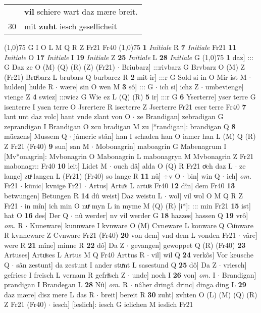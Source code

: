 \documentclass[8pt,a4paper,notitlepage]{article}
\begin{document}
\begin{table}[ht]
\begin{minipage}[t]{0.5\linewidth}
\begin{tabular}{rl}
 & \textbf{vil} schiere wart daz mære breit.\\ 
30 & mit \textbf{zuht} iesch gesellicheit\\ 
\end{tabular}
\scriptsize
\line(1,0){75} \newline
G I O L M Q R Z Fr21 Fr40 \newline
\line(1,0){75} \newline
\textbf{1} \textit{Initiale} R  \textbf{7} \textit{Initiale} Fr21  \textbf{11} \textit{Initiale} O  \textbf{17} \textit{Initiale} I  \textbf{19} \textit{Initiale} Z  \textbf{25} \textit{Initiale} L  \textbf{28} \textit{Initiale} G  \newline
\line(1,0){75} \newline
\textbf{1} daz] ::: G Daz ze O (M) (Q) (R) (Z) (Fr21)  $\cdot$ Briubarz] :::rivbarz G Brvbarz O (M) Z (Fr21) Bruͯbarz L brubars Q burbarcz R \textbf{2} mit ir] :::r G Sold si in O Mir ist M  $\cdot$ hulden] hulde R  $\cdot$ wære] sin O wen M \textbf{3} sô] ::: G  $\cdot$ ich si] ichz Z  $\cdot$ umbevienge] vienge Z \textbf{4} swiez] :::wiez G Wie ez L (Q) (R) \textbf{5} ir] :::r G \textbf{6} Yserterre] yser terre G isenterre I ysen terre O Jsrertere R iserterre Z Jserterre Fr21 eser terre Fr40 \textbf{7} lant unt daz volc] hant vnde zlant von O  $\cdot$ ze Brandigan] zebradigan G zeprandigan I Brandigan O zcu bradigan M zu [*randigan]: brandigan Q \textbf{8} müezens] Mussem Q  $\cdot$ jâmeric stân] han I schaden han O iamer han L (M) Q (R) Z Fr21 (Fr40) \textbf{9} sun] san M  $\cdot$ Mobonagrin] maboagrin G Mabenagrum I [Mv*onagrin]: Mvbonagrin O Mabonagrin L mabonagryn M Mvbonagrin Z Fr21 mabonagr:: Fr40 \textbf{10} leit] Lidet M  $\cdot$ ouch dâ] alda O (Q) R Fr21 oͯch daz L  $\cdot$ ze lange] zuͯ langen L (Fr21) (Fr40) so lange R \textbf{11} nû] ÷v O  $\cdot$ bin] win Q  $\cdot$ ich] \textit{om.} Fr21  $\cdot$ künic] kvnige Fr21  $\cdot$ Artus] Artuͯs L artuͦs Fr40 \textbf{12} dîn] dem Fr40 \textbf{13} betwungen] Betungen R \textbf{14} dû weist] Daz weistu L  $\cdot$ wol] vil wol O M Q R Z Fr21  $\cdot$ in mîn] ich min O nuͯ myn L in myme M (Q) (R) [i*]: ::: min Fr21 \textbf{15} ist] hat O \textbf{16} des] Der Q  $\cdot$ nû werder] nv vil werder G \textbf{18} hazzes] hassen Q \textbf{19} vrô] \textit{om.} R  $\cdot$ Kuneware] kunnware I kvnware O (M) Cvneware L konware Q Cuͦnware R kvnneware Z Cvnware Fr21 (Fr40) \textbf{20} von dem] vnd dem L vonden Fr21  $\cdot$ vâre] were R \textbf{21} mîne] minne R \textbf{22} dô] Da Z  $\cdot$ gevangen] gewoppet Q (R) (Fr40) \textbf{23} Artuses] Artuͯses L Artus M Q Fr40 Arttus R  $\cdot$ vil] wil Q \textbf{24} verkôs] Vor keusche Q  $\cdot$ sân zestunt] da zestunt I ander stuͯnt L sasestund Q \textbf{25} dô] Da Z  $\cdot$ vriesch] gefriese I freisch L vernam R gefriͤsch Z  $\cdot$ unde] noch I \textbf{26} von] \textit{om.} I  $\cdot$ Brandigan] prandigan I Brandegan L \textbf{28} Nû] \textit{om.} R  $\cdot$ nâher dringâ drinc] dinga ding L \textbf{29} daz mære] disz mere L das R  $\cdot$ breit] bereit R \textbf{30} zuht] zvhten O (L) (M) (Q) (R) Z Fr21 (Fr40)  $\cdot$ iesch] [ieslich]: iesch G iclichen M ieslich Fr21 \newline

\end{minipage}
\end{table}
\end{document}
